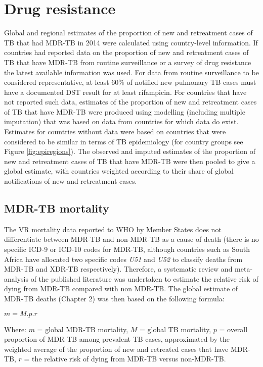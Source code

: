 \section{Drug resistance}

Global and regional estimates of the proportion of new and retreatment cases of TB that had MDR-TB in 2014 were calculated using country-level information. If countries had reported data on the proportion of new and retreatment cases of TB that have MDR-TB from routine surveillance or a survey of drug resistance the latest available information was used. For data from routine surveillance to be considered representative, at least 60\% of notified new pulmonary TB cases must have a documented DST result for at least rifampicin. For countries that have not reported such data, estimates of the proportion of new and retreatment cases of TB that have MDR-TB were produced using modelling (including multiple imputation) that was based on data from countries for which data do exist. Estimates for countries without data were based on countries that were considered to be similar in terms of TB epidemiology (for country groups see Figure \ref{fig:epiregions}). The observed and imputed estimates of the proportion of new and retreatment cases of TB that have MDR-TB were then pooled to give a global estimate, with countries weighted according to their share of global notifications of new and retreatment cases.

\subsection{MDR-TB mortality}

The VR mortality data reported to WHO by Member States does not differentiate between MDR-TB and non-MDR-TB as a cause of death (there is no specific ICD-9 or ICD-10 codes for MDR-TB, although countries such as South Africa have allocated two specific codes \textit{U51} and \textit{U52} to classify deaths from MDR-TB and XDR-TB respectively). Therefore, a systematic review and meta-analysis of the published literature was undertaken to estimate the relative risk of dying from MDR-TB compared with non MDR-TB. The global estimate of MDR-TB deaths (Chapter 2) was then based on the following formula: 

$m = M.p.r$ 

Where:
$m$ = global MDR-TB mortality,
$M$ = global TB mortality,
$p$ = overall proportion of MDR-TB among prevalent TB cases, approximated by the weighted average of the proportion of new and retreated cases that have MDR-TB,
$r$ = the relative risk of dying from MDR-TB versus non-MDR-TB.

